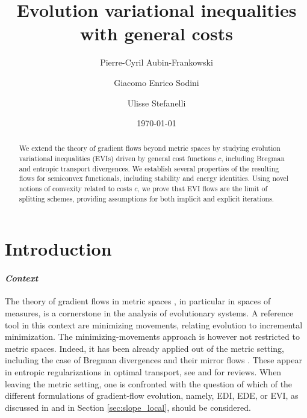 \documentclass[reqno]{amsart}
\title[Evolution variational inequalities with general costs]{Evolution variational inequalities with general costs}
\author{Pierre-Cyril Aubin-Frankowski}
\author{Giacomo Enrico Sodini}
\author{Ulisse Stefanelli}
\date{\today}
\theoremstyle{plain}
\theoremstyle{remark}
\theoremstyle{plain}
\numberwithin{equation}{section}
\theoremstyle{remark}
\begin{document}
\begin{abstract} We extend the theory of gradient flows beyond metric spaces by studying evolution variational inequalities (EVIs)  driven by  general cost functions $c$,  including  Bregman and entropic transport divergences. We establish several properties of the resulting flows for semiconvex functionals, including stability and energy identities. Using novel notions of convexity  related to   costs $c$, we prove that EVI flows are the limit of splitting schemes, providing assumptions for both implicit and explicit iterations.
\end{abstract}
\maketitle
\tableofcontents
\thispagestyle{empty}

\section{Introduction}

\paragraph{\em\bfseries Context} The theory of gradient flows in metric spaces \cite{ags08}, in particular in  spaces of measures, is a  cornerstone  in  the analysis of evolutionary systems.  A reference tool in this context are minimizing movements, relating evolution to incremental minimization. The minimizing-movements approach is however not restricted to metric spaces. Indeed,  it has been  already  applied  out of the metric setting,  including  the case of  Bregman divergences \cite[eq.(1.4)]{Bregman1967} and their mirror flows \cite{NemirovskyYudinBook1983}.  These  appear in entropic regularizations in optimal transport, see \cite{Leonard2014} and \cite{Peyre2019} for reviews.  When leaving the metric setting,  one is confronted with the question of which of the different formulations of gradient-flow evolution, namely, EDI, EDE, or EVI, as discussed in \cite{Ambrosio2012userguide, Santambrogio2017}  and in Section \ref{sec:slope_local},  should be considered. 
\medskip
\end{document}

